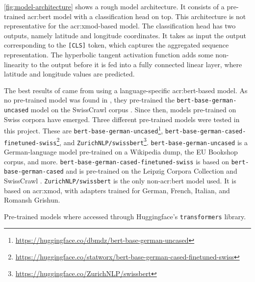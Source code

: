 \autoref{fig:model-architecture} shows a rough model architecture. It consists of a pre-trained \acrshort{acr:bert} model with a classification head on top. This architecture is not representative for the \acrshort{acr:xmod}-based model. The classification head has two outputs, namely  latitude and longitude coordinates. It takes as input the output corresponding to the \texttt{[CLS]} token, which captures the aggregated sequence representation. The hyperbolic tangent activation function adds some non-linearity to the output before it is fed into a fully connected linear layer, where latitude and longitude values are predicted.

The best results of \cite{scherrerHeLjuVarDial20202020} came from using a language-specific \acrshort{acr:bert}-based model. As no pre-trained model was found in \citeyear{scherrerHeLjuVarDial20202020}, they pre-trained the \texttt{bert-base-german-uncased} model on the SwissCrawl corpus \citep[3-4]{scherrerHeLjuVarDial20202020}. Since then, models pre-trained on Swiss corpora have emerged. Three different pre-trained models were tested in this project. These are \texttt{bert-base-german-uncased}\footnote{\url{https://huggingface.co/dbmdz/bert-base-german-uncased}}, \texttt{bert-base-german-cased-finetuned-swiss}\footnote{\url{https://huggingface.co/statworx/bert-base-german-cased-finetuned-swiss}}, and \texttt{ZurichNLP/swissbert}\footnote{\url{https://huggingface.co/ZurichNLP/swissbert}}. \texttt{bert-base-german-uncased} is a German-language model pre-trained on a Wikipedia dump, the EU Bookshop corpus, and more. \texttt{bert-base-german-cased-finetuned-swiss} is based on \texttt{bert-base-german-cased} and is pre-trained on the Leipzig Corpora Collection \citep{goldhahnBuildingLargeMonolingual} and SwissCrawl \citep{linderAutomaticCreationText2020}. \texttt{ZurichNLP/swissbert} is the only non-\acrshort{acr:bert} model used. It is based on \acrshort{acr:xmod}, with adapters trained for German, French, Italian, and Romansh Grishun.

Pre-trained models where accessed through Huggingface's \texttt{transformers} library.


